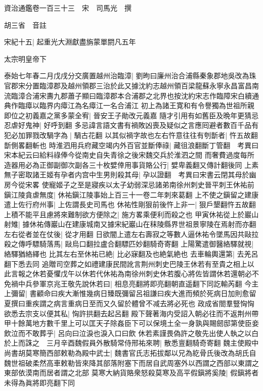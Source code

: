 資治通鑑卷一百三十三　宋　司馬光　撰

胡三省　音註

宋紀十五|{
	起重光大淵獻盡旃蒙單閼凡五年}


太宗明皇帝下

泰始七年春二月戊戌分交廣置越州治臨漳|{
	劉昫曰廉州治合浦縣秦象郡地吳改為珠官郡宋分置臨漳郡及越州領郡三治於此又據沈約志越州領百梁龍蘇永寧永昌富昌南流臨漳合浦宋夀九郡蕭子顯曰臨漳郡本合浦郡之北界也按沈約宋志作臨障宋白續通典作臨瘴以臨界内瘴江為名瘴江一名合浦江}
初上為諸王寛和有令譽獨為世祖所親即位之初義嘉之黨多蒙全宥|{
	晉安王子勛改元義嘉}
隨才引用有如舊臣及晩年更猜忌忍虐好鬼神|{
	好呼到翻}
多忌諱言語文書有禍敗凶喪及疑似之言應囘避者數百千品有犯必加罪戮改騧字為|{
	騧古花翻}
以其似禍字故也左右忤意往往有刳斮者|{
	忤五故翻斮側畧翻斬也}
時淮泗用兵府藏空竭内外百官並斷俸祿|{
	藏徂浪翻斷丁管翻　考異曰宋本紀云曰給料祿俸今從南史自失青徐之後宋魏交兵於淮泗之間}
而奢費過度每所造器用必為正御副御次副各三十枚嬖倖用事貨賂公行|{
	嬖卑義翻又傳計翻後同}
上素無子密取諸王姬有孕者内宫中生男則殺其母|{
	孕以證翻　考異曰宋書云閉其母於幽房今從宋畧}
使寵姬子之至是寢疾以太子幼弱深忌諸弟南徐州刺史晉平刺王休祐前鎭江陵貪虐無度|{
	休祐鎭江陵事始上百三十一卷二年刺來葛翻}
上不使之鎭留之建康遣上佐行府州事|{
	上佐謂長史司馬也}
休祐性剛狠前後忤上非一|{
	狠戶墾翻忤五故翻}
上積不能平且慮將來難制欲方便除之|{
	施方畧乘便利而殺之也}
甲寅休祐從上於巖山射雉|{
	據休祐傳巖山在建康城南又據宋紀巖山在秣陵縣界世祖景寧陵在焉射而亦翻}
左右從者並在仗後|{
	從才用翻}
日欲闇上遣左右壽寂之等數人逼休祐令墜馬因共敺拉殺之傳呼驃騎落馬|{
	敺烏口翻拉盧合翻驃匹妙翻騎奇寄翻}
上陽驚遣御醫絡驛就視|{
	絡驛猶絡繹也}
比其左右至休祐已絶|{
	比必寐翻及也絶氣絶也}
去車輪輿還第|{
	去羌呂翻下悉去同}
追贈司空葬之如禮建康民間訛言荆州刺史巴陵王休若有至貴之相上以此言報之休若憂懼戊午以休若代休祐為南徐州刺史休若腹心將佐皆謂休若還朝必不免禍中兵參軍京兆王敬先說休若曰|{
	相息亮翻將即亮翻朝直遥翻下同訖輸芮翻}
今主上彌留|{
	書顧命曰疾大漸惟幾病日臻既彌留呂祖謙曰疾大進而頻於死病日加則愈留夏撰曰重疾謂之病言重病日至而又久留於體曾不减去將必死也}
政成省閤羣豎恟恟欲悉去宗支以便其私|{
	恟許拱翻去起呂翻}
殿下聲著海内受詔入朝必往而不返荆州帶甲十餘萬地方數千里上可以匡天子除姦臣下可以保境土全一身孰與賜劒邸第使臣妾飲泣而不敢葬乎|{
	呂向曰泣淚也淚入口曰飲}
休若素謹畏偽許之敬先出使人執之以白於上而誅之　三月辛酉魏假員外散騎常侍邢祐來聘|{
	散悉亶翻騎奇寄翻}
魏主使殿中尚書胡莫寒簡西部敕勒為殿中武士|{
	魏書官氏志拓拔鄰以兄為紇骨氏後改為胡氏自魏世祖破柔然高車敕勒皆來降其部落附塞下而居自武周塞外以西謂之西部以東謂之東部依漠南而居者謂之北部}
莫寒大納貨賂衆怒殺莫寒及高平假鎭將奚陵|{
	假鎭將者未得為眞將即亮翻下同}
